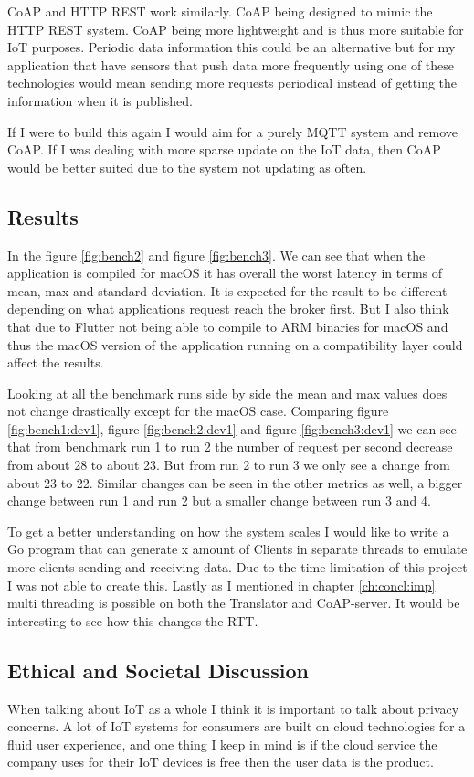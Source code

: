 CoAP and HTTP REST work similarly. CoAP being designed to mimic the HTTP REST system. CoAP being more lightweight and is thus more suitable for IoT purposes. \cite{coapTech} Periodic data information this could be an alternative but for my application that have sensors that push data more frequently using one of these technologies would mean sending more requests periodical instead of getting the information when it is published.

If I were to build this again I would aim for a purely MQTT system and remove CoAP. If I was dealing with more sparse update on the IoT data, then CoAP would be better suited due to the system not updating as often.


\subsection{Results}
In the figure \ref{fig:bench2} and figure \ref{fig:bench3}. We can see that when the application is compiled for macOS it has overall the worst latency in terms of mean, max and standard deviation. It is expected for the result to be different depending on what applications request reach the broker first. But I also think that due to Flutter not being able to compile to ARM binaries for macOS and thus the macOS version of the application running on a compatibility layer could affect the results.

Looking at all the benchmark runs side by side the mean and max values does not change drastically except for the macOS case. Comparing figure \ref{fig:bench1:dev1}, figure \ref{fig:bench2:dev1} and figure \ref{fig:bench3:dev1} we can see that from benchmark run 1 to run 2 the number of request per second decrease from about 28 to about 23. But from run 2 to run 3 we only see a change from about 23 to 22. Similar changes can be seen in the other metrics as well, a bigger change between run 1 and run 2 but a smaller change between run 3 and 4. 

To get a better understanding on how the system scales I would like to write a Go program that can generate x amount of Clients in separate threads to emulate more clients sending and receiving data. Due to the time limitation of this project I was not able to create this. Lastly as I mentioned in chapter \ref{ch:concl:imp} multi threading is possible on both the Translator and CoAP-server. It would be interesting to see how this changes the RTT.

\subsection{Ethical and Societal Discussion}
\label{ch:concl:ethical}
When talking about IoT as a whole I think it is important to talk about privacy concerns. A lot of IoT systems for consumers are built on cloud technologies for a fluid user experience, and one thing I keep in mind is if the cloud service the company uses for their IoT devices is free then the user data is the product. 

